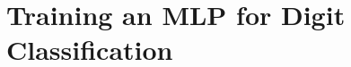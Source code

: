 \documentclass[12pt]{article}
\begin{document}
\clearpage

\section{Training an MLP for Digit Classification}





\end{document}
